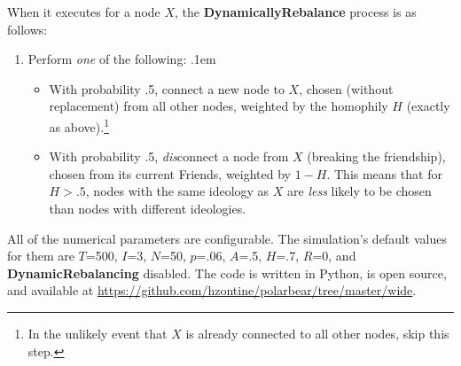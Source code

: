 When it executes for a node $X$, the \textbf{DynamicallyRebalance} process is
as follows:
\begin{enumerate}
\item Perform \textit{one} of the following:
\itemsep.1em
\begin{itemize}
\item With probability .5, connect a new node to $X$, chosen (without
replacement) from all other nodes, weighted by the homophily $H$ (exactly as
above).\footnote{In the unlikely event that $X$ is already connected to all
other nodes, skip this step.}
\item With probability .5, \textit{dis}connect a node from $X$ (breaking the
friendship), chosen from its current Friends, weighted by $1-H$. This means
that for $H>.5$, nodes with the same ideology as $X$ are \textit{less} likely
to be chosen than nodes with different ideologies.
\end{itemize}
\end{enumerate}


All of the numerical parameters are configurable. The simulation's default
values for them are $T$=500, $I$=3, $N$=50, $p$=.06, $A$=.5, $H$=.7, $R$=0,
and \textbf{DynamicRebalancing} disabled. The code is written in Python, is
open source, and available at
\url{https://github.com/hzontine/polarbear/tree/master/wide}.
